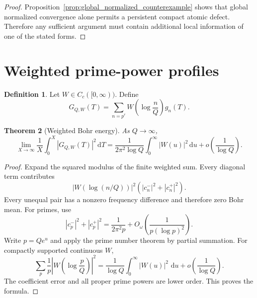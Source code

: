 \documentclass[11pt]{amsart}
\numberwithin{equation}{section}
\theoremstyle{plain}
\newtheorem{theorem}{Theorem}[section]
\theoremstyle{definition}
\newtheorem{definition}[theorem]{Definition}
\theoremstyle{remark}
\newcommand{\1}{\mathbf{1}}
\newcommand{\dd}{\,\mathrm{d}}
\begin{document}
\begin{proof}
Proposition~\ref{prop:global_normalized_counterexample} shows that global
normalized convergence alone permits a persistent compact atomic defect.
Therefore any sufficient argument must contain additional local
information of one of the stated forms.
\end{proof}

\section{Weighted prime-power profiles}
\label{sec:weighted_profiles}

\begin{definition}
\label{def:weighted_profile}
Let \(W\in C_c([0,\infty))\).  Define
\begin{equation}
G_{Q,W}(T)
=
\sum_{n=p^r}
W\left(\log\frac nQ\right)g_n(T).
\label{eq:weighted_profile_sum}
\end{equation}
\end{definition}

\begin{theorem}[Weighted Bohr energy]
\label{thm:weighted_bohr_energy}
As $Q\to\infty$,
\begin{equation}
\lim_{X\to\infty}\frac1X\int_0^X|G_{Q,W}(T)|^2\dd T
=
\frac1{2\pi^2\log Q}
\int_0^\infty|W(u)|^2\dd u
+
o\left(\frac1{\log Q}\right).
\label{eq:weighted_bohr_energy}
\end{equation}
\end{theorem}

\begin{proof}
Expand the squared modulus of the finite weighted sum.  Every diagonal term
contributes
\begin{equation}
|W(\log(n/Q))|^2
\left(|c_n^-|^2+|c_n^+|^2\right).
\label{eq:weighted_bohr_diagonal}
\end{equation}
Every unequal pair has a nonzero frequency difference and therefore zero
Bohr mean.  For primes, use
\begin{equation}
|c_p^-|^2+|c_p^+|^2
=
\frac1{2\pi^2p}
+
O_\omega\left(\frac1{p(\log p)^2}\right).
\label{eq:weighted_bohr_prime_coeff}
\end{equation}
Write \(p=Qe^u\) and apply the prime number theorem by partial summation.
For compactly supported continuous \(W\),
\begin{equation}
\sum_p\frac1p
\left|W\!\left(\log\frac pQ\right)\right|^2
=
\frac1{\log Q}
\int_0^\infty|W(u)|^2\,\dd u
+
o\left(\frac1{\log Q}\right).
\label{eq:weighted_bohr_pnt}
\end{equation}
The coefficient error and all proper prime powers are lower order.  This
proves the formula.
\end{proof}
\end{document}
